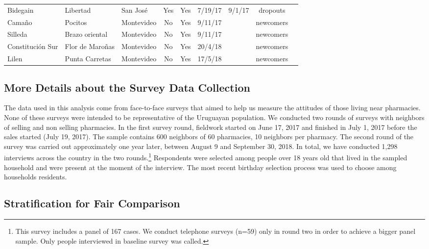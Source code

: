 \documentclass[11pt]{article}
\begin{document}
\begin{small}
\begin{table}[htbp!]
\begin{tabular}{@{}lllcccccc@{}}
 Bidegain	 	&	 	Libertad	 	&	 	San José	 	&	 	Yes	 	&	 	Yes	 	&	 	7/19/17	 	&	 	9/1/17	 	&	 	dropouts	\\
 Camaño	 	&	 	Pocitos	 	&	 	Montevideo	 	&	 	No	 	&	 	Yes	 	&	 	9/11/17	 	&	 		 	&	 	newcomers	\\
 Silleda	 	&	 	Brazo oriental	 	&	 	Montevideo	 	&	 	No	 	&	 	Yes	 	&	 	9/11/17	 	&	 		 	&	 	newcomers\\
 Constitución Sur	 	&	 	Flor de Maroñas	 	&	 	Montevideo	 	&	 	No	 	&	 	Yes	 	&	 	20/4/18	 	&	 		 	&	 	newcomers	\\
 Lilen	 	&	 	Punta Carretas	 	&	 	Montevideo	 	&	 	No	 	&	 	Yes	 	&	 	17/5/18	 	&	 		 	&	 	newcomers	\\
\bottomrule
\end{tabular}
\end{table}
\end{small}

\subsection{More Details about the Survey Data Collection}
The data used in this analysis come from face-to-face surveys that aimed to help us measure the attitudes of those living near pharmacies. None of these surveys were intended to be representative of the Uruguayan population. We conducted two rounds of surveys with neighbors of selling and non selling pharmacies. In the first survey round, fieldwork started on June 17, 2017 and finished in July 1, 2017 before the sales started (July 19, 2017). The sample contains 600 neighbors of 60 pharmacies, 10 neighbors per pharmacy. The second round of the survey was carried out approximately one year later, between August 9 and September 30, 2018. In total, we have conducted 1,298 interviews across the country in the two rounds.\footnote{This survey includes a panel of 167 cases. We conduct telephone surveys (n=59) only in round two in order to achieve a bigger panel sample. Only people interviewed in baseline survey was called.} Respondents were selected among people over 18 years old that lived in the sampled household and were present at the moment of the interview. The most recent birthday selection process was used to choose among households residents.

\subsection{Stratification for Fair Comparison}
\end{document}
